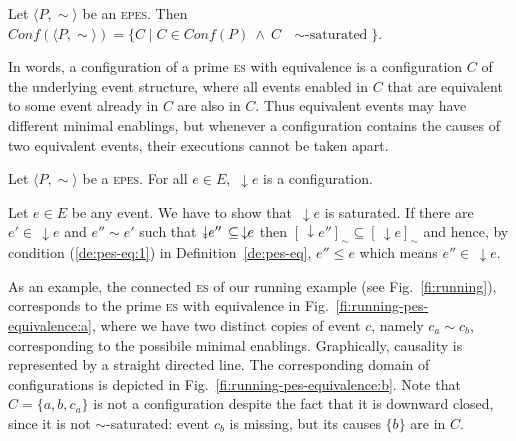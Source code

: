 \documentclass[conference]{IEEEtran}
\renewenvironment{proof}{\begin{IEEEproof}}{\end{IEEEproof}}
\newcommand{\esabbr}{\textsc{es}}
\newcommand{\eseqabbr}{\textsc{epes}}
\newcommand{\eqclass}[2][]{\ensuremath{[{#2}]_{\scriptscriptstyle {#1}}}}
\newcommand{\eqclasscup}[2]{\ensuremath{{#2}_{\scriptscriptstyle {#1}}}}
\newcommand{\conf}[1]{\ensuremath{\mathit{Conf}({#1})}}
\newcommand\twoheaddownarrow{\mathrel{\raisebox{0.8\depth}{\rotatebox{270}{$\twoheadrightarrow$}}}}
\newcommand{\scauses}[1]{\ensuremath{\twoheaddownarrow\!\!{#1}\,}}
\newcommand{\causes}[1]{\ensuremath{\,\downarrow\!\!{#1}}}
\begin{document}

\begin{definition}[configurations]
  \label{de:epes-conf}
  Let $\langle P, \sim \rangle$ be an {\eseqabbr}. Then
  $\conf{\langle P, \sim \rangle} = \{ C \mid C \in \conf{P}\ \land\
  C\mbox{ $\sim$-saturated}\}$.
\end{definition}

In words, a configuration of a prime {\esabbr} with equivalence is a
configuration $C$ of the underlying event structure, where all events
enabled in $C$ that are equivalent to some event already in $C$ are also in
$C$. Thus equivalent events may have different minimal enablings,
but whenever a configuration contains the causes of two equivalent
events, their executions cannot be taken apart.


\begin{lemma}
  \label{le:hist-conf}
  Let $\langle P, \sim \rangle$ be a {\eseqabbr}. For all $e \in E$,
  $\causes{e}$ is a configuration.
\end{lemma}

\begin{proof}
  Let $e \in E$ be any event. We have to show that
  $\causes{e}$ is saturated. If there are
  $e' \in \causes{e}$ and $e'' \sim e'$ such that
  $\scauses{e''} \subseteq \causes{e}$ then
  $\eqclass[\sim]{\causes{e''}} \subseteq
  \eqclass[\sim]{\causes{e}}$ and hence, by condition (\ref{de:pes-eq:1}) in
  Definition~\ref{de:pes-eq}, $e'' \leq e$ which means
  $e'' \in \causes{e}$.
\end{proof}
   
As an example, the connected {\esabbr} of our running example (see
Fig.~\ref{fi:running}), corresponds to the prime {\esabbr} with
equivalence in {Fig.~\ref{fi:running-pes-equivalence:a}}, where we have two
distinct copies of event $c$, namely $c_a \sim c_b$, corresponding to
the possibile minimal enablings. Graphically, causality is represented
by a straight directed line. The corresponding domain of configurations is depicted in {Fig.~\ref{fi:running-pes-equivalence:b}}. Note that $C=\{ a, b, c_a\}$ is not a configuration despite the fact that it is {downward} closed, since it is not $\sim$-saturated: event $c_b$ is missing, but its causes {$\{b\}$} are in $C$.%
\end{document}

